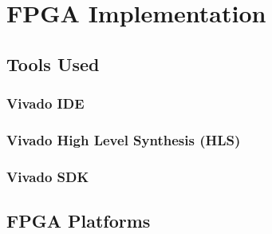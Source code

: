 \chapter{FPGA Implementation}
\label{Chapter-FPGA-Implementation}

\section{Tools Used}
\subsection{Vivado IDE}
\subsection{Vivado High Level Synthesis (HLS)}
\subsection{Vivado SDK}

\section{FPGA Platforms}
